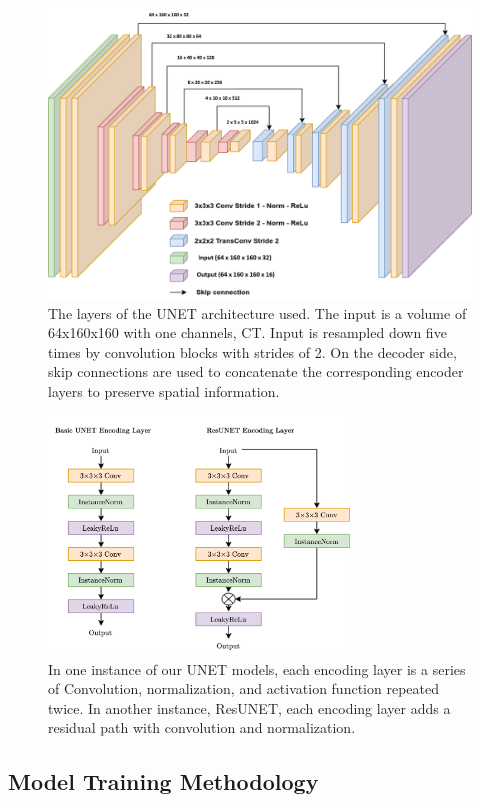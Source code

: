 \documentclass[runningheads]{llncs}
\begin{document}
\begin{figure}
    \centering
    \includegraphics[width=\textwidth]{amos_model_architecture.png}
    \caption{The layers of the UNET architecture used. The input is a volume of 64x160x160 with one channels, CT. Input is resampled down five times by convolution blocks with strides of 2. On the decoder side, skip connections are used to concatenate the corresponding encoder layers to preserve spatial information.} \label{fig2}
\end{figure}
\begin{figure}
    \centering
    \includegraphics[width=80mm]{encoding-layer.png}
    \caption{In one instance of our UNET models, each encoding layer is a series of Convolution, normalization, and activation function repeated twice. In another instance, ResUNET, each encoding layer adds a residual path with convolution and normalization.} \label{fig3}
\end{figure}

\subsection{Model Training Methodology}
\end{document}

